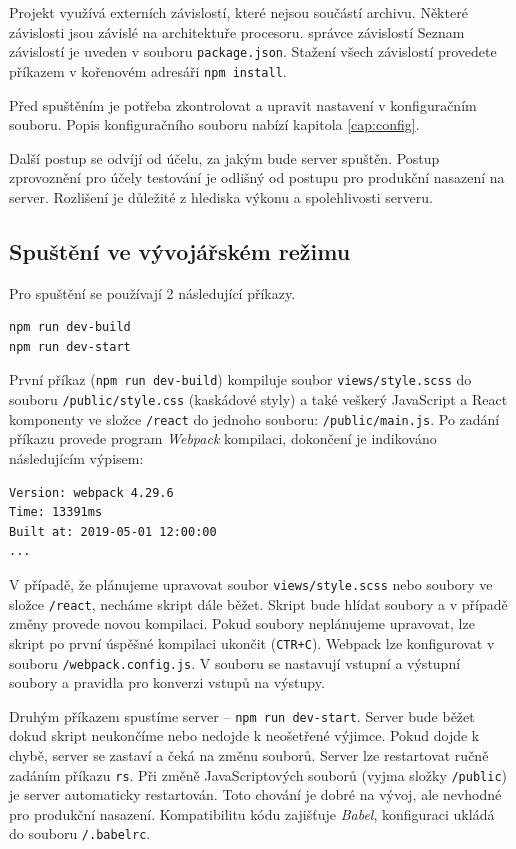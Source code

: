 Projekt využívá externích závislostí, které nejsou součástí archivu. Některé závislosti jsou závislé na architektuře procesoru. správce závislostí  Seznam závislostí je uveden v souboru \texttt{package.json}. Stažení všech závislostí provedete příkazem v kořenovém adresáři \texttt{npm install}.

Před spuštěním je potřeba zkontrolovat a upravit nastavení v konfiguračním souboru. Popis konfiguračního souboru nabízí kapitola \ref{cap:config}.

Další postup se odvíjí od účelu, za jakým bude server spuštěn. Postup zprovoznění pro účely testování je odlišný od postupu pro produkční nasazení na server. Rozlišení je důležité z hlediska výkonu a spolehlivosti serveru.

\subsection{Spuštění ve vývojářském režimu}
Pro spuštění se používají 2 následující příkazy.
\begin{lstlisting}[style=bash]
npm run dev-build
npm run dev-start
\end{lstlisting}
První příkaz (\texttt{npm run dev-build}) kompiluje soubor \texttt{views/style.scss} do souboru \texttt{/public/style.css} (kaskádové styly) a také veškerý JavaScript a React komponenty ve složce \texttt{/react} do jednoho souboru: \texttt{/public/main.js}. Po zadání příkazu provede program \textit{Webpack} kompilaci, dokončení je indikováno následujícím výpisem:
\begin{lstlisting}
Version: webpack 4.29.6
Time: 13391ms
Built at: 2019-05-01 12:00:00
...
\end{lstlisting}

V případě, že plánujeme upravovat soubor \texttt{views/style.scss} nebo soubory ve složce \texttt{/react}, necháme skript dále běžet. Skript bude hlídat soubory a v případě změny provede novou kompilaci. Pokud soubory neplánujeme upravovat, lze skript po první úspěšné kompilaci ukončit (\texttt{CTR+C}). Webpack lze konfigurovat v souboru \texttt{/webpack.config.js}. V souboru se nastavují vstupní a výstupní soubory a pravidla pro konverzi vstupů na výstupy.

Druhým příkazem spustíme server -- \texttt{npm run dev-start}. Server bude běžet dokud skript neukončíme nebo nedojde k neošetřené výjimce. Pokud dojde k chybě, server se zastaví a čeká na změnu souborů. Server lze restartovat ručně zadáním příkazu \texttt{rs}. Při změně JavaScriptových souborů (vyjma složky \texttt{/public}) je server automaticky restartován. Toto chování je dobré na vývoj, ale nevhodné pro produkční nasazení. Kompatibilitu kódu zajišťuje \textit{Babel}, konfiguraci ukládá do souboru \texttt{/.babelrc}.

